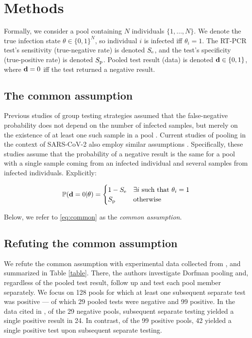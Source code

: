 \documentclass{article}
\begin{document}
\section*{Methods}

Formally, we consider a pool containing $N$ individuals
$\{1,\dots,N\}$. We denote the true infection state $\theta \in
\{0,1\}^N$, so individual $i$ is infected iff $\theta_i=1$. The RT-PCR
test's sensitivity (true-negative rate) is denoted $S_{\text{e}}$, and the
test's specificity (true-positive rate) is denoted $S_{\text{p}}$. Pooled
test result (data) is denoted $\mathbf{d} \in \{0,1\}$, where $\mathbf{d}=0$ iff
the test returned a negative result.

\subsection*{The common assumption}\label{subsec:common}
Previous studies of group testing strategies assumed that the
false-negative probability does not depend on the number of infected
samples, but merely on the existence of at least one such sample in a
pool \cite{Kim, OptimalDorfmanPool}. Current studies of pooling in the
context of SARS-CoV-2 also employ similar assumptions
\cite{Simplistic1, Simplistic2}. Specifically, these studies assume
that the probability of a negative result is the same for a pool with
a single sample coming from an infected individual and several
 samples from infected individuals. Explicitly:

\begin{align}\label{eq:common}
  \mathbb{P}(\mathbf{d}=0|\theta) = 
  \begin{cases} 
    1-S_{\text{e}} & \exists i\ \text{such that } \theta_i = 1\\
    S_{\text{p}} & \text{otherwise}
  \end{cases} 
\end{align}

Below, we refer to \eqref{eq:common} as the \emph{common
  assumption}. 


\subsection*{Refuting the common assumption}\label{subsec:refute}
We refute the common assumption with experimental data collected from
\cite{Salazar}, and summarized in Table \ref{table}. There, the
authors investigate Dorfman pooling and, regardless of the pooled test
result, follow up and test each pool member separately. We focus on
128 pools for which at least one subsequent separate test was positive
--- of which 29 pooled tests were negative and 99 positive. In the
data cited in \cite{Salazar}, of the 29 negative pools, subsequent
separate testing yielded a single positive result in 24. In contrast,
of the 99 positive pools, 42 yielded a single positive test upon
subsequent separate testing.
\end{document}

